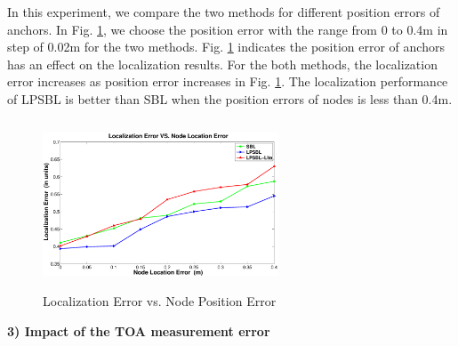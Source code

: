  In this experiment, we compare the two methods for different position errors of anchors. 
 In Fig. \ref{fig5}, we choose the position error with the range from 0 to 0.4m in step of 0.02m for the two methods. 
 Fig. \ref{fig5} indicates the position error of anchors has an effect on the localization results. 
 For the both methods, the localization error increases as position error increases in Fig. \ref{fig5}. 
 The localization performance of LPSBL is better than SBL when the position errors of nodes is less than 0.4m.
  \begin{figure}[htb]
            \centering
		   \vspace{-2mm}
			 \includegraphics[height=5.0cm,width=7.0cm]{image/locationerror.eps}
              \caption{Localization Error vs. Node Position Error}
             \vspace{-5mm}
             \label{fig5}
        \end{figure}

\textbf{3) Impact of the TOA measurement error}

